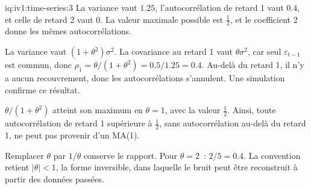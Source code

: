 \begin{solution}{iq:iv1:time-series:3}
La variance vaut $1.25$, l'autocorrélation de retard 1 vaut $0.4$, et celle de retard 2 vaut 0. La valeur maximale possible est $\frac12$, et le coefficient 2 donne les mêmes autocorrélations.

La variance vaut $(1 + \theta^2)\sigma^2$. La covariance au retard 1 vaut $\theta\sigma^2$, car seul $\varepsilon_{t - 1}$ est commun, donc $\rho_1 = \theta/(1 + \theta^2) = 0.5/1.25 = 0.4$. Au-delà du retard 1, il n'y a aucun recouvrement, donc les autocorrélations s'annulent. Une simulation confirme ce résultat.

$\theta/(1 + \theta^2)$ atteint son maximum en $\theta = 1$, avec la valeur $\frac12$. Ainsi, toute autocorrélation de retard 1 supérieure à $\frac12$, sans autocorrélation au-delà du retard 1, ne peut pas provenir d'un MA(1).

Remplacer $\theta$ par $1/\theta$ conserve le rapport. Pour $\theta = 2$~: $2/5 = 0.4$. La convention retient $|\theta| < 1$, la forme inversible, dans laquelle le bruit peut être reconstruit à partir des données passées.



\end{solution}

